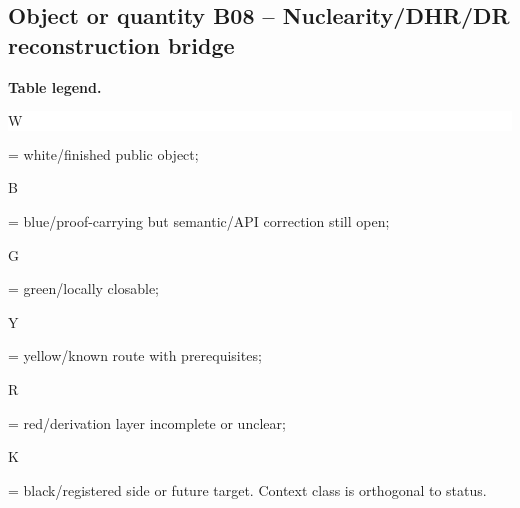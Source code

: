 \subsection*{Object or quantity B08 -- Nuclearity/\allowbreak{}DHR/\allowbreak{}DR reconstruction bridge}
\hypertarget{objproof:B08}{}
\par\smallskip\noindent\begin{minipage}{0.99\linewidth}\footnotesize\raggedright\textbf{Table legend.} \colorbox{white}{\strut W} = white/finished public object; \colorbox{cyan!20}{\strut B} = blue/proof-carrying but semantic/API correction still open; \colorbox{green!18}{\strut G} = green/locally closable; \colorbox{yellow!25}{\strut Y} = yellow/known route with prerequisites; \colorbox{red!20}{\strut R} = red/derivation layer incomplete or unclear; \colorbox{black!18}{\strut K} = black/registered side or future target. Context class is orthogonal to status.\end{minipage}\par\vspace{0.25em}
